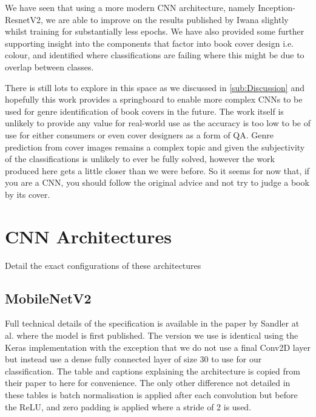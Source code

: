 \documentclass[12pt]{article}
\numberwithin{equation}{section}
\numberwithin{figure}{section}
\begin{document}
We have seen that using a more modern CNN architecture, namely Inception-ResnetV2, we are able to improve on the results published by Iwana slightly whilst training for substantially less epochs. We have also provided some further supporting insight into the components that factor into book cover design i.e. colour, and identified where classifications are failing where this might be due to overlap between classes.

There is still lots to explore in this space as we discussed in \cref{sub:Discussion} and hopefully this work provides a springboard to enable more complex CNNs to be used for genre identification of book covers in the future. The work itself is unlikely to provide any value for real-world use as the accuracy is too low to be of use for either consumers or even cover designers as a form of QA. Genre prediction from cover images remains a complex topic and given the subjectivity of the classifications is unlikely to ever be fully solved, however the work produced here gets a little closer than we were before. So it seems for now that, if you are a CNN, you should follow the original advice and not try to judge a book by its cover.


 

\appendix

\section{CNN Architectures} 
\label{sec:CNN_Architectures} 
Detail the exact configurations of these architectures
\subsection{MobileNetV2} 
\label{sub:MobileNetV2} 
Full technical details of the specification is available in the paper by Sandler at al. \cite{Sandler2018} where the model is first published. The version we use is identical using the Keras implementation with the exception that we do not use a final Conv2D layer but instead use a dense fully connected layer of size 30 to use for our classification. The table and captions explaining the architecture is copied from their paper to here for convenience. The only other difference not detailed in these tables is batch normalisation is applied after each convolution but before the ReLU, and zero padding is applied where a stride of 2 is used. 
\end{document}
